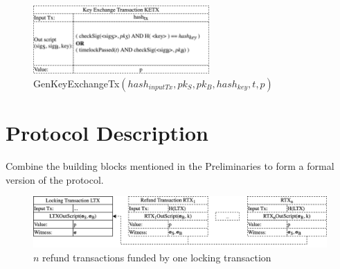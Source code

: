 \documentclass{cacthesis}
\newcounter{protocol}
\begin{document}
        \begin{figure}
            \begin{center}
              \includegraphics[width=0.6\textwidth]{images/GenKeyExchangeTx.png}
              \caption{\textsf{GenKeyExchangeTx}$(hash_{inputTx}, pk_S, pk_B, hash_{key}, t, p)$}
              \label{fig:genKeyExchangeTx}
            \end{center}
        \end{figure}
        
        \section{Protocol Description}
        Combine the building blocks mentioned in the Preliminaries to form a formal version of the protocol.
        
        \begin{figure}
            \begin{center}
                \includegraphics[width=\textwidth]{images/locking_refund_tx_figure.png}
              \caption{$n$ refund transactions funded by one locking transaction}
              \label{fig:lockingRefundTx}
            \end{center}
            \end{figure}
            
\end{document}
